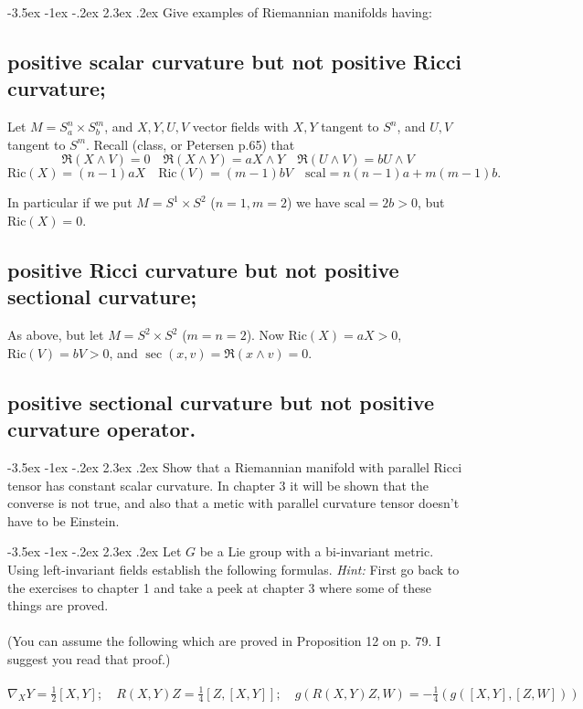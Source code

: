 \documentclass[10pt]{article}
\makeatletter
\renewcommand\section{\@startsection{section}{1}{\z@}%
                                  {-3.5ex \@plus -1ex \@minus -.2ex}%
                                  {2.3ex \@plus.2ex}%
                                  {\normalfont\large\bfseries}}
\newcommand{\ric}{\mbox{Ric}}
\newcommand{\scal}{\mbox{scal}}
\newcommand{\hint}[1]{{\emph{Hint:} #1}} %
\makeatother
\begin{document}

\section{Give examples of Riemannian manifolds having:}
\subsection{positive scalar curvature but not positive Ricci curvature;}

Let $M = S^n_a \times S_b^m$, and $X,Y, U,V$ vector fields with $X,Y$ tangent to $S^n$, and $U,V$ tangent to $S^m$. 
Recall (class, or Petersen p.65) that
\[\mathfrak{R} (X \wedge V) = 0 \quad \mathfrak{R} (X \wedge Y) = a X \wedge Y \quad \mathfrak{R} (U \wedge V) = b U \wedge V \]
\[\ric (X) = (n-1) a X \quad \ric(V) = (m-1) bV \quad \scal = n(n-1) a + m(m-1) b.\]

In particular if we put $M = S^1 \times S^2$ ($n=1 , m=2$) we have $\scal = 2b > 0$, but $\ric(X) = 0$.

\subsection{positive Ricci curvature but not positive sectional curvature;}

As above, but let $M = S^2 \times S^2$ ($m=n=2$). Now $\ric(X) = a X > 0$, $\ric(V) = b V > 0 $, and $\sec(x,v) = \mathfrak{R}(x \wedge v) = 0$.

\subsection{positive sectional curvature but not positive curvature operator.}

\section{Show that a Riemannian manifold with parallel Ricci tensor has constant scalar curvature. In chapter 3 it will be shown that the converse is not true, and also that a metic with parallel curvature tensor doesn't have to be Einstein.}

\section{Let $G$ be a Lie group with a bi-invariant metric. Using 
left-invariant fields establish the following formulas. \hint{First go back to the exercises to chapter 1 and take a peek at chapter 3 where some of these things   are proved.} \\ \\ (You can assume the following which are proved in Proposition 12 on p. 79. I suggest you read that proof.) \\ \\ $\nabla_X Y = \frac{1}{2} [X,Y]; \quad R(X,Y)Z = \frac{1}{4}[Z,[X,Y]]; \quad g(R(X,Y)Z,W) = - \frac{1}{4} (g([X,Y],[Z,W]))$}
\end{document}
